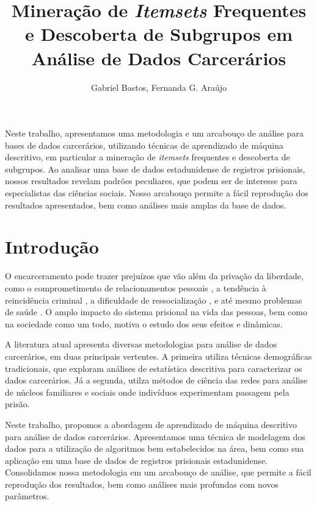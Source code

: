 \documentclass[12pt]{article}
\title{Mineração de \textit{Itemsets} Frequentes e Descoberta de Subgrupos em Análise de Dados Carcerários}
\author{Gabriel Bastos\inst{1}, Fernanda G. Araújo\inst{1} }
\begin{document}
 

\maketitle

\begin{resumo} 
  Neste trabalho, apresentamos uma metodologia e um arcabouço de análise para bases de dados carcerários, utilizando técnicas de aprendizado de máquina descritivo, em particular a mineração de \textit{itemsets} frequentes e descoberta de subgrupos. Ao analisar uma base de dados estadunidense de registros prisionais, nossos resultados revelam padrões peculiares, que podem ser de interesse para especialistas das ciências sociais. Nosso arcabouço permite a fácil reprodução dos resultados apresentados, bem como análises mais amplas da base de dados.
\end{resumo}


\section{Introdução}

O encarceramento pode trazer prejuízos que vão além da privação da liberdade, como o comprometimento de relacionamentos pessoais \cite{Apel2010}, a tendência à reincidência criminal \cite{Bales2012}, a dificuldade de ressocialização \cite{doi:10.1177/002242787301000102}, e até mesmo problemas de saúde \cite{10.1093/heapro/dap034}. O amplo impacto do sistema prisional na vida das pessoas, bem como na sociedade como um todo, motiva o estudo dos seus efeitos e dinâmicas.

A literatura atual apresenta diversas metodologias para análise de dados carcerários, em duas principais vertentes. A primeira utiliza técnicas demográficas tradicionais, que exploram análises de estatística descritiva para caracterizar os dados carcerários. Já a segunda, utilza métodos de ciência das redes para análise de núcleos familiares e sociais onde indivíduos experimentam passagem pela prisão. \cite{Chung_2018}

Neste trabalho, propomos a abordagem de aprendizado de máquina descritivo para análise de dados carcerários. Apresentamos uma técnica de modelagem dos dados para a utilização de algoritmos bem estabelecidos na área, bem como sua aplicação em uma base de dados de registros prisionais estadunidense. Consolidamos nossa metodologia em um arcabouço de análise, que permite a fácil reprodução dos resultados, bem como análises mais profundas com novos parâmetros.
\end{document}
